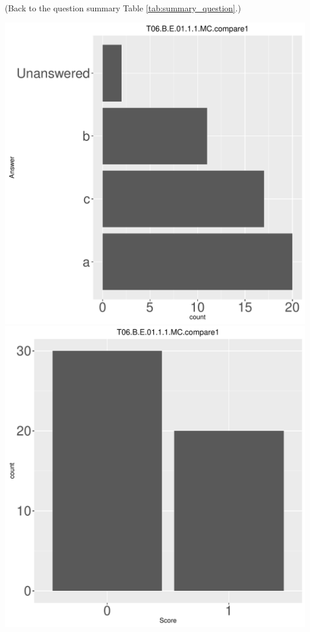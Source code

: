 \documentclass[12pt,english,nohyper]{tufte-handout}\usepackage[]{graphicx}\usepackage[]{color}
\begin{document}
 (Back to the question summary Table \ref{tab:summary_question}.)

\begin{center} \includegraphics[width=.45\linewidth]{Topic06_AB_17_answer} \includegraphics[width=.45\linewidth]{Topic06_AB_17_score} \end{center} 
\end{document}
